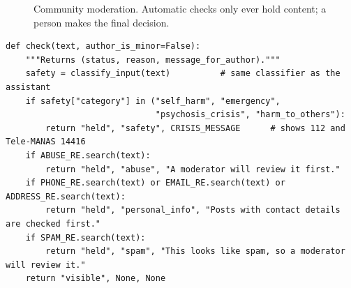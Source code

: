 \documentclass[11pt,a4paper]{article}
\newcommand{\code}[1]{\texttt{#1}}
\begin{document}
\begin{figure}[H]
\centering
{}
\caption{Community moderation. Automatic checks only ever hold content; a person makes the final decision.}
\label{fig:moderation}
\end{figure}

\par\noindent\begin{minipage}{\linewidth}\begin{lstlisting}[caption={Automatic community checks hold content; they never delete it (\code{nbapp/moderation.py}, shortened).},label={lst:mod}]
def check(text, author_is_minor=False):
    """Returns (status, reason, message_for_author)."""
    safety = classify_input(text)          # same classifier as the assistant
    if safety["category"] in ("self_harm", "emergency",
                              "psychosis_crisis", "harm_to_others"):
        return "held", "safety", CRISIS_MESSAGE      # shows 112 and Tele-MANAS 14416
    if ABUSE_RE.search(text):
        return "held", "abuse", "A moderator will review it first."
    if PHONE_RE.search(text) or EMAIL_RE.search(text) or ADDRESS_RE.search(text):
        return "held", "personal_info", "Posts with contact details are checked first."
    if SPAM_RE.search(text):
        return "held", "spam", "This looks like spam, so a moderator will review it."
    return "visible", None, None
\end{lstlisting}\end{minipage}\par
\end{document}

